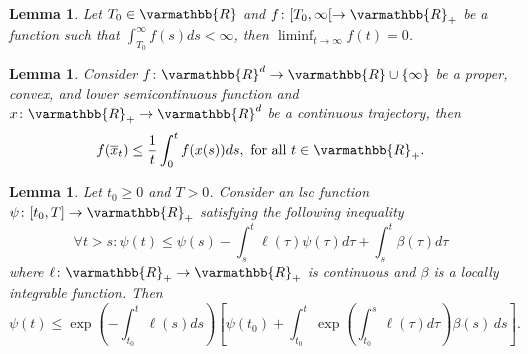 \documentclass[11pt,reqno]{article}
\let\mathbb=\varmathbb
\newcommand{\R}{\mathbb{R}}
\newcommand{\1}{\mathds{1}}
\newcommand{\Aver}[2]{\overline{#1}_{#2}}
\numberwithin{equation}{section}  %
\theoremstyle{plain}
\newtheorem{lemma}[theorem]{Lemma}
\theoremstyle{definition}
\theoremstyle{remark}
\numberwithin{theorem}{section}
\numberwithin{remark}{section}
\numberwithin{example}{section}
\begin{document}
    \begin{lemma}\label{lem-convergence-zero}
    	Let $T_0\in \R$ and $f\colon [T_0,\infty[\to \R_+$ be a function such that  $\int_{T_0}^{\infty}f(s)ds<\infty$, then $\displaystyle\liminf_{t\to \infty} f(t) = 0$.
    \end{lemma}
    
    \begin{lemma}\label{jensen-convex}
    	Consider $f\colon \R^d \to \R\cup \{\infty\}$ be a proper, convex, and lower semicontinuous function  and $x\colon \R_+\to \R^d$ be a continuous trajectory, then
    	\begin{equation*}
    		f(\Aver{x}{t} )\leq \frac{1}{t}\int_0^tf(x(s))ds, \text{ for all  } t\in \R_+.
    	\end{equation*}
    \end{lemma}

    
    \begin{lemma}\label{lemma-comparison}
    	Let $t_0\geq 0$ and $T>0$. Consider an lsc function $\psi\colon [t_0,T]\to \R_+$ satisfying the following inequality
    	\begin{equation*}
    		\forall t>s  : \psi(t)\leq \psi(s) - \int_s^t\ell(\tau)\psi(\tau)d\tau + \int_s^t\beta(\tau)d\tau
    	\end{equation*}
    	where $\ell\colon \R_+\to \R_+$ is continuous and $\beta$ is a locally integrable function. Then 
        \[ \psi(t)\leq \exp\left(-\int_{t_0}^t \ell(s)ds\right)\left[\psi(t_0) + \int_{t_0}^t \exp\left(\int_{t_0}^s\ell(\tau)d\tau\right) \beta(s)\,ds\right].\]
    \end{lemma}
    
\end{document}
